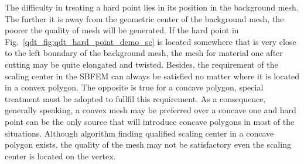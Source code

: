 The difficulty in treating a hard point lies in its position in the background mesh.
The further it is away from the geometric center of the background mesh, the poorer the quality of mesh will be generated.
If the hard point in Fig.~\ref{qdt_fig:qdt_hard_point_demo_sc} is located somewhere that is very close to the left boundary of the background mesh, the mesh for material one after cutting may be quite elongated and twisted.
Besides, the requirement of the scaling center in the SBFEM can always be satisfied no matter where it is located in a convex polygon.
The opposite is true for a concave polygon, special treatment must be adopted to fullfil this requirement.
As a consequence, generally speaking, a convex mesh may be preferred over a concave one and hard point can be the only source that will introduce concave polygons in most of the situations.
Although algorithm finding qualified scaling center in a concave polygon exists, the quality of the mesh may not be satisfactory even the scaling center is located on the vertex.


